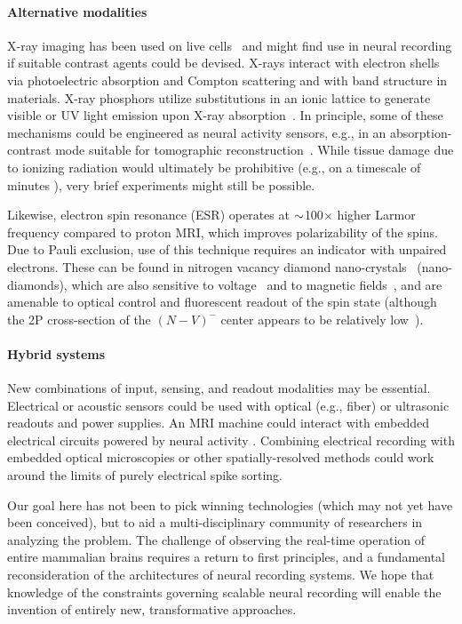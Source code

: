 \paragraph{Alternative modalities} X-ray imaging has been used on live cells~\cite{moosmann13} and might find use in neural recording if suitable contrast agents could be devised.
X-rays interact with electron shells via photoelectric absorption and Compton scattering and with band structure in materials.
X-ray phosphors utilize substitutions in an ionic lattice to generate visible or UV light emission upon X-ray absorption~\cite{issler95}.
In principle, some of these mechanisms could be engineered as neural activity sensors, e.g., in an absorption-contrast mode suitable for tomographic reconstruction~\cite{larabell04}. While tissue damage due to ionizing radiation would ultimately be prohibitive (e.g., on a timescale of minutes \cite{WoodPersonalCommunication}), very brief experiments might still be possible.

Likewise, electron spin resonance (ESR) operates at ${\sim}$100$\times$ higher Larmor frequency compared to proton MRI, which improves polarizability of the spins.
Due to Pauli exclusion, use of this technique requires an indicator with unpaired electrons. These can be found in nitrogen vacancy diamond nano-crystals~\cite{horowitz12} (nano-diamonds), which are also sensitive to voltage~\cite{dolde11} and to magnetic fields~\cite{Hall2012}, and are amenable to optical control and fluorescent readout of the spin state (although the 2P cross-section of the $(N-V)^-$ center appears to be relatively low~\cite{Tse-Luen2007}).

\paragraph{Hybrid systems} New combinations of input, sensing, and readout modalities may be essential. Electrical or acoustic sensors could be used with optical \cite{sadek2010wiring} (e.g., fiber) or ultrasonic readouts and power supplies. An MRI machine could interact with embedded electrical circuits powered by neural activity \cite{JasanoffInductorsGrant}. Combining electrical recording with embedded optical microscopies or other spatially-resolved methods could work around the limits of purely electrical spike sorting.

Our goal here has not been to pick winning technologies (which may not yet have been conceived), but to aid a multi-disciplinary community of researchers in analyzing the problem. 
The challenge of observing the real-time operation of entire mammalian brains requires a return to first principles, and a fundamental reconsideration of the architectures of neural recording systems.
We hope that knowledge of the constraints governing scalable neural recording will enable the invention of entirely new, transformative approaches.

